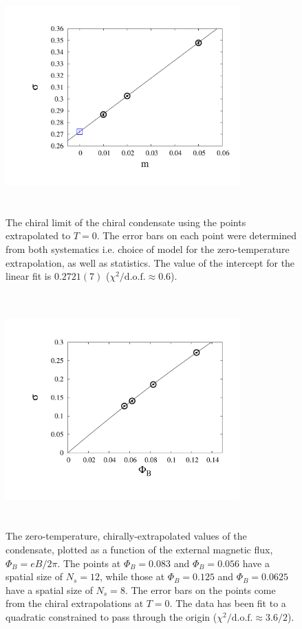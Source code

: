\documentclass[aps,prd,twocolumn,showpacs,superscriptaddress,groupedaddress]{revtex4}  %
\begin{document}
\begin{figure}
\vspace{-1.2cm}
  \includegraphics[height=9cm,width=9cm]{pbp_vs_m_PHI0125_zeroT_lin_graphene_paper_new.pdf} 
  \vspace{-1.25cm}
\caption{The chiral limit of the chiral condensate using the points extrapolated to $T=0$. The error bars on each point were determined from both systematics i.e. choice of model for the zero-temperature extrapolation, as well as statistics. The value of the intercept for the linear fit is $0.2721(7)$ ($\chi^2/\text{d.o.f.} \approx 0.6$).}
\label{PBPzeroTChiral}
\end{figure}

\begin{figure}
\vspace{-1.2cm}
 \includegraphics[height=9cm,width=9cm]{pbp_vs_PHI_graphene_paper_new.pdf} 
 \vspace{-1.25cm}
\caption{The zero-temperature, chirally-extrapolated values of the condensate, plotted as a function of the external magnetic flux,  $\Phi_B = eB/2\pi$.  The points at $\Phi_B=0.083$ and $\Phi_B=0.056$ have a spatial size of $N_s=12$, while those at $\Phi_B=0.125$ and $\Phi_B=0.0625$ have a spatial size of $N_s=8$. The error bars on the points come from the chiral extrapolations at $T=0$. The data has been fit to a quadratic constrained to pass through the origin ($\chi^2/\text{d.o.f.} \approx 3.6/2$). } 
\label{PBPzeroTChiralvseB}
\end{figure}
\end{document}
